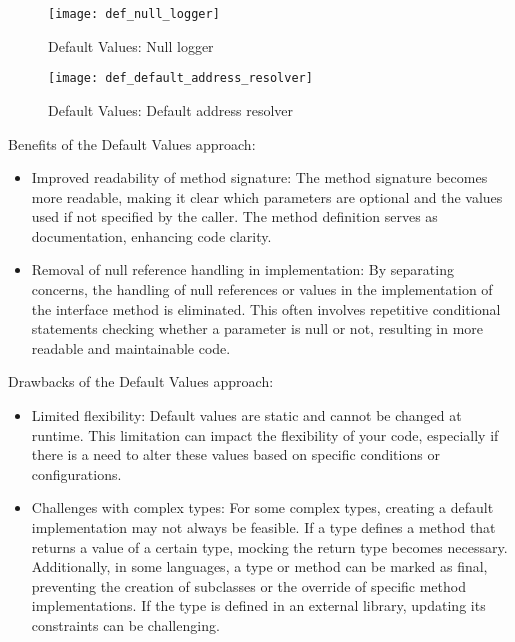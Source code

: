 \begin{figure}[!htb]
    \centering
    \texttt{[image: def\_null\_logger]}
    \caption{Default Values: Null logger}
    \label{fig:def_null_logger}
\end{figure}

\begin{figure}[!htb]
    \centering
    \texttt{[image: def\_default\_address\_resolver]}
    \caption{Default Values: Default address resolver}
    \label{fig:def_default_address_resolver}
\end{figure}

Benefits of the Default Values approach:

\begin{itemize}
    \item Improved readability of method signature:
    The method signature becomes more readable, making it clear which parameters are optional and the values
    used if not specified by the caller.
    The method definition serves as documentation, enhancing code clarity.
    \item Removal of null reference handling in implementation:
    By separating concerns, the handling of null references or values in the implementation of the interface method
    is eliminated.
    This often involves repetitive conditional statements checking whether a parameter is null or not,
    resulting in more readable and maintainable code.
\end{itemize}

Drawbacks of the Default Values approach:

\begin{itemize}
    \item Limited flexibility:
    Default values are static and cannot be changed at runtime.
    This limitation can impact the flexibility of your code, especially if there is a need to alter these values
    based on specific conditions or configurations.
    \item Challenges with complex types:
    For some complex types, creating a default implementation may not always be feasible.
    If a type defines a method that returns a value of a certain type, mocking the return type becomes necessary.
    Additionally, in some languages, a type or method can be marked as final, preventing the creation of subclasses
    or the override of specific method implementations.
    If the type is defined in an external library, updating its constraints can be challenging.
\end{itemize}


